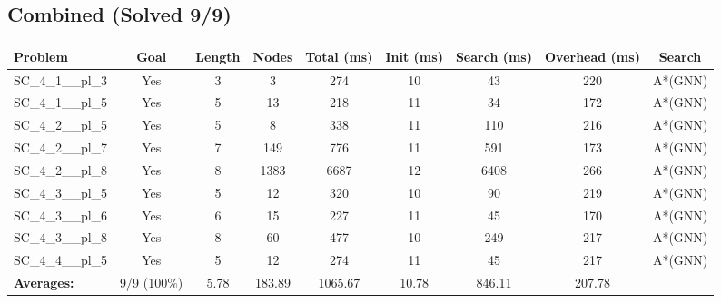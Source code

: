 \documentclass{article}
\begin{document}
\subsection*{Combined (Solved 9/9)}
\begin{tabular}{lcccccccc}
\toprule
Problem & Goal & Length & Nodes & Total (ms) & Init (ms) & Search (ms) & Overhead (ms) & Search \\
\midrule
SC\_4\_1\_\_pl\_3 & Yes & 3 & 3 & 274 & 10 & 43 & 220 & A*(GNN) \\
SC\_4\_1\_\_pl\_5 & Yes & 5 & 13 & 218 & 11 & 34 & 172 & A*(GNN) \\
SC\_4\_2\_\_pl\_5 & Yes & 5 & 8 & 338 & 11 & 110 & 216 & A*(GNN) \\
SC\_4\_2\_\_pl\_7 & Yes & 7 & 149 & 776 & 11 & 591 & 173 & A*(GNN) \\
SC\_4\_2\_\_pl\_8 & Yes & 8 & 1383 & 6687 & 12 & 6408 & 266 & A*(GNN) \\
SC\_4\_3\_\_pl\_5 & Yes & 5 & 12 & 320 & 10 & 90 & 219 & A*(GNN) \\
SC\_4\_3\_\_pl\_6 & Yes & 6 & 15 & 227 & 11 & 45 & 170 & A*(GNN) \\
SC\_4\_3\_\_pl\_8 & Yes & 8 & 60 & 477 & 10 & 249 & 217 & A*(GNN) \\
SC\_4\_4\_\_pl\_5 & Yes & 5 & 12 & 274 & 11 & 45 & 217 & A*(GNN) \\
\textbf{Averages:} & 9/9 (100\%) & 5.78 & 183.89 & 1065.67 & 10.78 & 846.11 & 207.78 & \\
\bottomrule
\end{tabular}
\\[0.7cm]
\end{document}

